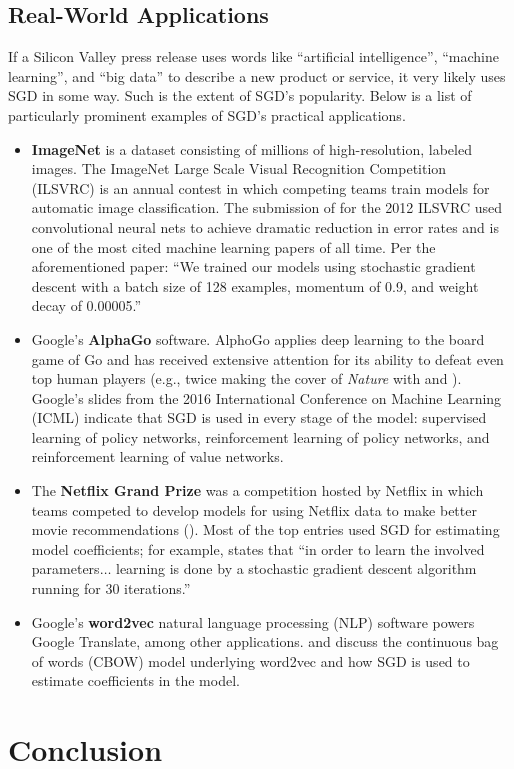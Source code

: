\documentclass{article}
\begin{document}
\subsection{Real-World Applications}

If a Silicon Valley press release uses words like ``artificial intelligence'',
``machine learning'', and ``big data'' to describe a new product or service, it very likely
uses SGD in some way. Such is the extent of SGD's popularity. 
Below is a list of particularly prominent examples of SGD's practical
applications.

\begin{itemize}
	\item \textbf{ImageNet} is a dataset consisting of millions
		of high-resolution, labeled images. The
		ImageNet Large Scale Visual Recognition Competition (ILSVRC) is
		an annual contest in which competing teams train models for
		automatic image classification. The submission of \cite{krizhevsky2012imagenet} 
		for the 2012 ILSVRC used convolutional neural
		nets to achieve dramatic reduction in error rates and is
		one of the most cited machine learning papers of all time. Per the aforementioned paper: ``We
		trained our models using stochastic gradient descent with a
		batch size of 128 examples, momentum of 0.9, and weight decay of
		0.00005.''
	\item Google's \textbf{AlphaGo} software. AlphoGo applies deep learning to the
		board game of Go and has received extensive attention for its
		ability to defeat even top human players (e.g., twice making the
		cover of \textit{Nature} with \cite{silver2016mastering} and
		\cite{silver2017mastering}). Google's slides from the 2016
		International Conference on Machine Learning (ICML) indicate
		that SGD is used in every stage of the
		model: supervised learning of policy networks, reinforcement
		learning of policy networks, and reinforcement learning of value
		networks.
	\item The \textbf{Netflix Grand Prize} was a competition hosted by
		Netflix in which teams competed to develop models for
		using Netflix data to make better movie recommendations
		(\cite{bennett2007netflix}). Most of the top entries used
		SGD for estimating model coefficients; for example,
		\cite{koren2009bellkor} states that ``in order to learn the
		involved parameters$\ldots$ learning is done by a stochastic
		gradient descent algorithm running for 30 iterations.'' 
	\item Google's \textbf{word2vec} natural language processing (NLP)
		software powers Google Translate, among other applications.
		\cite{mikolov2013distributed} and \cite{rong2014word2vec}
		discuss the continuous bag of words (CBOW) model underlying
		word2vec and how SGD is used to estimate coefficients
		in the model.
\end{itemize}

\section{Conclusion}

\printbibliography
\end{document}
